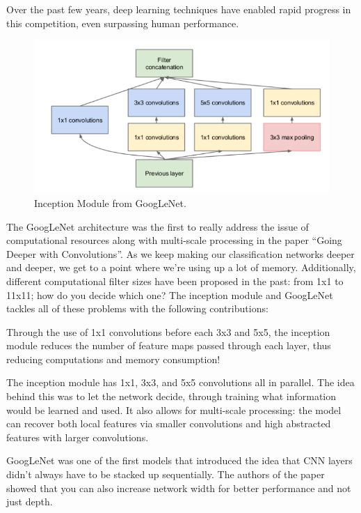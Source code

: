 \documentclass[10pt,journal,compsoc]{IEEEtran}
\begin{document}
Over the past few years, deep learning techniques have enabled rapid progress in this competition, even surpassing human performance.

\begin{figure}[thpb]
      \centering
      \includegraphics[width=\linewidth]{images/googlenet.png}
      \caption{Inception Module from GoogLeNet.}
      \label{fig:googlenet}
\end{figure}

The GoogLeNet \cite{googlenet} architecture was the first to really address the issue of computational resources along with multi-scale processing in the paper “Going Deeper with Convolutions”. As we keep making our classification networks deeper and deeper, we get to a point where we’re using up a lot of memory. Additionally, different computational filter sizes have been proposed in the past: from 1x1 to 11x11; how do you decide which one? The inception module and GoogLeNet tackles all of these problems with the following contributions:

Through the use of 1x1 convolutions before each 3x3 and 5x5, the inception module reduces the number of feature maps passed through each layer, thus reducing computations and memory consumption!

The inception module has 1x1, 3x3, and 5x5 convolutions all in parallel. The idea behind this was to let the network decide, through training what information would be learned and used. It also allows for multi-scale processing: the model can recover both local features via smaller convolutions and high abstracted features with larger convolutions. 

GoogLeNet was one of the first models that introduced the idea that CNN layers didn’t always have to be stacked up sequentially. The authors of the paper showed that you can also increase network width for better performance and not just depth.
\end{document}
